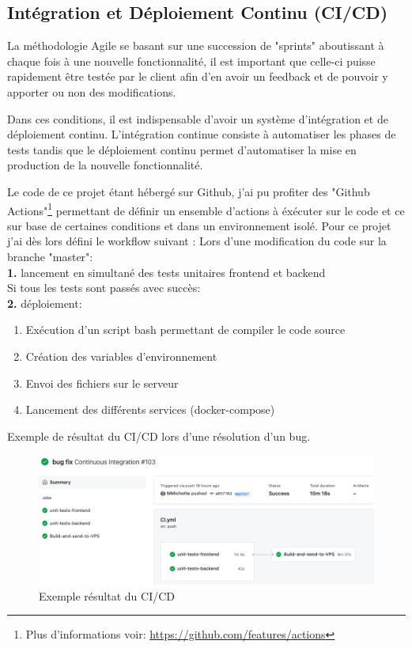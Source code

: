 
\newpage
\subsection{Intégration et Déploiement Continu (CI/CD)}

La méthodologie Agile se basant sur une succession de "sprints" aboutissant à chaque fois à une nouvelle fonctionnalité, il est important que celle-ci puisse rapidement être testée par le client afin d'en avoir un feedback et de pouvoir y apporter ou non des modifications. 

\newpara
Dans ces conditions, il est indispensable d'avoir un système d'intégration et de déploiement continu. L'intégration continue consiste à automatiser les phases de tests tandis que le déploiement continu permet d'automatiser la mise en production de la nouvelle fonctionnalité. 

\newpara
Le code de ce projet étant hébergé sur Github, j'ai pu profiter des "Github Actions"\footnote{Plus d'informations voir: \url{https://github.com/features/actions}} permettant de définir un ensemble d'actions à éxécuter sur le code et ce sur base de certaines conditions et dans un environnement isolé. Pour ce projet j'ai dès lors défini le workflow suivant :
\linebreak \linebreak
Lors d'une modification du code sur la branche "master": \\
\textbf{1.} lancement en simultané des tests unitaires frontend et backend \\
Si tous les tests sont passés avec succès: \\
\textbf{2.} déploiement:
\begin{enumerate}[label=(\alph*)]
  \item Exécution d'un script bash permettant de compiler le code source
  \item Création des variables d'environnement
  \item Envoi des fichiers sur le serveur 
  \item Lancement des différents services (docker-compose)
\end{enumerate}

\newpara

Exemple de résultat du CI/CD lors d'une résolution d'un bug. 
\begin{figure}[H]
  \centering
  \includegraphics[width=\linewidth]{img/CI-result.png}
  \caption{Exemple résultat du CI/CD}
\end{figure}
